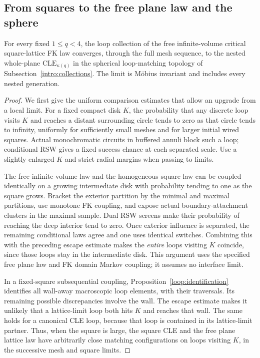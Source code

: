 \subsection{From squares to the free plane law and the sphere}
\label{loop:wholeplane}

\begin{theorem}
\label{loop:plane}
For every fixed $1\le q<4$, the loop collection of the free
infinite-volume critical square-lattice FK law converges, through the
full mesh sequence, to the nested whole-plane
$\mathrm{CLE}_{\kappa(q)}$ in the spherical loop-matching topology
of Subsection~\ref{intro:collections}.  The limit is M\"obius invariant and includes every
nested generation.
\end{theorem}

\begin{proof}
We first give the uniform comparison estimates that allow an upgrade
from a local limit.  For a fixed compact disk $K$, the probability
that any discrete loop visits $K$ and reaches a distant surrounding
circle tends to zero as that circle tends to infinity, uniformly for
sufficiently small meshes and for larger initial wired squares.
Actual monochromatic circuits in buffered annuli block such a loop;
conditional RSW gives a fixed success chance at each separated scale.
Use a slightly enlarged $K$ and strict radial margins when passing
to limits.

The free infinite-volume law and the homogeneous-square law can be
coupled identically on a growing intermediate disk with probability
tending to one as the square grows.  Bracket the exterior partition
by the minimal and maximal partitions, use monotone FK coupling, and
expose actual boundary-attachment clusters in the maximal sample.
Dual RSW screens make their probability of reaching the deep interior
tend to zero.  Once exterior influence is separated, the remaining
conditional laws agree and one uses identical switches.  Combining
this with the preceding escape estimate makes the \emph{entire}
loops visiting $K$ coincide, since those loops stay in the intermediate
disk.  This argument uses the specified free plane law and FK domain
Markov coupling; it assumes no interface limit.

In a fixed-square subsequential coupling,
Proposition~\ref{loop:identification} identifies all wall-away
macroscopic loop elements, with their traversals.  Its remaining
possible discrepancies involve the wall.  The escape estimate makes
it unlikely that a lattice-limit loop both hits $K$ and reaches that
wall.  The same holds for a canonical CLE loop, because that loop is
contained in its lattice-limit partner.  Thus, when the square is
large, the square CLE and the free plane lattice law have arbitrarily
close matching configurations on loops visiting $K$, in the
successive mesh and square limits.


\end{proof}
